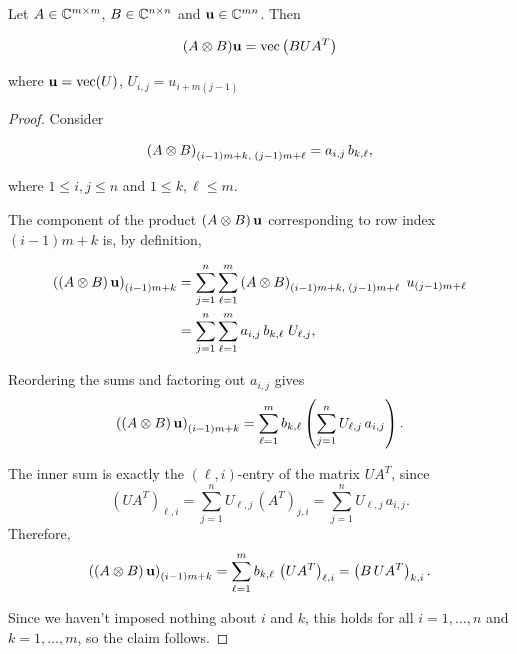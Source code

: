 \begin{proposition}
    Let $A \in \mathbb{C}^{m \times m}$, $B \in \mathbb{C}^{n \times n}$ and $\mathbf{u} \in \mathbb{C}^{mn}$. Then 

    \[(A \otimes B)\mathbf{u} = \mathrm{vec}\left(BUA^T\right)\]

    where $\mathbf{u} = \mathrm{vec}(U)$, $U_{i,j} =  u_{i + m(j - 1)}$ 

    \label{prop:tensorprod}
\end{proposition}

\begin{proof}

    Consider

    \[
        \left(A \otimes B\right)_{\left(i-1\right)m+k,\;\left(j-1\right)m+\ell} 
        = a_{i,j}\,b_{k,\ell},
    \]

    where $1 \leq i,j \leq n$ and $1 \leq k,\ell \leq m$.

    The component of the product $\left(A \otimes B\right)\mathbf{u}$ corresponding to 
    row index $\left(i-1\right)m+k$ is, by definition,

    \begin{align*}
        \left(\left(A \otimes B\right)\mathbf{u}\right)_{\left(i-1\right)m+k}
        &= \sum_{j=1}^n \sum_{\ell=1}^m 
        \left(A \otimes B\right)_{\left(i-1\right)m+k,\;\left(j-1\right)m+\ell}\; 
        u_{\left(j-1\right)m+\ell} \\
        &= \sum_{j=1}^n \sum_{\ell=1}^m a_{i,j}\,b_{k,\ell}\; U_{\ell,j},
    \end{align*}

    Reordering the sums and factoring out $a_{i,j}$ gives
    \[
        \left(\left(A \otimes B\right)\mathbf{u}\right)_{\left(i-1\right)m+k}
        = \sum_{\ell=1}^m b_{k,\ell}\left(\sum_{j=1}^n U_{\ell,j}\,a_{i,j}\right).
    \]

    The inner sum is exactly the $\left(\ell,i\right)$-entry of the matrix $UA^T$, since
    \[
        \left(UA^T\right)_{\ell,i} 
        = \sum_{j=1}^n U_{\ell,j}\,\left(A^T\right)_{j,i} 
        = \sum_{j=1}^n U_{\ell,j}\,a_{i,j}.
    \]
    Therefore,
    \[
        \left(\left(A \otimes B\right)\mathbf{u}\right)_{\left(i-1\right)m+k}
        = \sum_{\ell=1}^m b_{k,\ell}\,\left(UA^T\right)_{\ell,i}
        = \left(B\,UA^T\right)_{k,i}.
    \]
    
    Since we haven't imposed nothing about $i$ and $k$, this holds for all $i=1,\dots,n$ and $k=1,\dots,m$, so the claim follows.

\end{proof}

